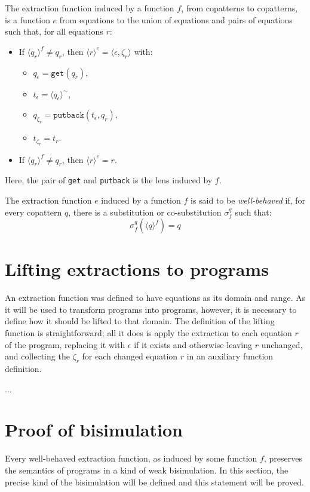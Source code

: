 \begin{definition}
The extraction function induced by a function $f$, from copatterns to copatterns, is a function $e$ from equations to the union of equations and pairs of equations such that, for all equations $r$:
\begin{itemize}
\item If $\langle q_r \rangle^f \neq q_r$, then $\langle r \rangle^e = \big\langle \epsilon, \zeta_r \big\rangle$ with:
\begin{itemize}
\item $q_\epsilon = \mathtt{get}(q_r)$,
\item $t_\epsilon = \langle q_\epsilon \rangle^{\sim}$,
\item $q_{\zeta_r} = \mathtt{putback}(t_\epsilon, q_r)$,
\item $t_{\zeta_r} = t_r$.
\end{itemize}

\item If $\langle q_r \rangle^f \neq q_r$, then $\langle r \rangle^e = r$.
\end{itemize}
Here, the pair of \texttt{get} and \texttt{putback} is the lens induced by $f$.
\end{definition}

\begin{definition}
The extraction function $e$ induced by a function $f$ is said to be \textit{well-behaved} if, for every copattern $q$, there is a substitution or co-substitution $\sigma^q_f$ such that:
\[
\sigma^q_f(\langle q \rangle^f) = q
\]
\end{definition}

\section{Lifting extractions to programs}

An extraction function was defined to have equations as its domain and range. As it will be used to transform programs into programs, however, it is necessary to define how it should be lifted to that domain. The definition of the lifting function is straightforward; all it does is apply the extraction to each equation $r$ of the program, replacing it with $\epsilon$ if it exists and otherwise leaving $r$ unchanged, and collecting the $\zeta_r$ for each changed equation $r$ in an auxiliary function definition.

...

\section{Proof of bisimulation}

Every well-behaved extraction function, as induced by some function $f$, preserves the semantics of programs in a kind of weak bisimulation. In this section, the precise kind of the bisimulation will be defined and this statement will be proved.

